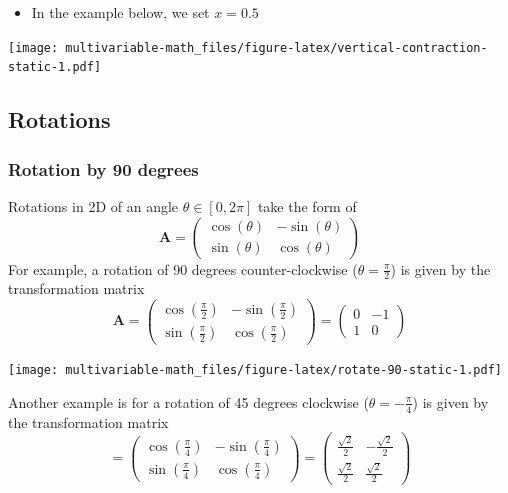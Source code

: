 \documentclass[
]{book}
\providecommand{\tightlist}{%
  \setlength{\itemsep}{0pt}\setlength{\parskip}{0pt}}
\theoremstyle{definition}
\theoremstyle{definition}
\theoremstyle{definition}
\theoremstyle{definition}
\theoremstyle{remark}
\begin{document}
\begin{itemize}
\tightlist
\item
  In the example below, we set \(x = 0.5\)
\end{itemize}

\texttt{[image: multivariable-math\_files/figure-latex/vertical-contraction-static-1.pdf]}

\hypertarget{rotations}{%
\subsection{Rotations}\label{rotations}}

\hypertarget{rotation-by-90-degrees}{%
\subsubsection{Rotation by 90 degrees}\label{rotation-by-90-degrees}}

Rotations in 2D of an angle \(\theta \in [0, 2\pi]\) take the form of
\[
\mathbf{A} = \begin{pmatrix}
\cos(\theta) & -\sin(\theta) \\
\sin(\theta) & \cos(\theta)
\end{pmatrix}
\]
For example, a rotation of 90 degrees counter-clockwise (\(\theta = \frac{\pi}{2}\)) is given by the transformation matrix
\[
\mathbf{A} = \begin{pmatrix}
\cos(\frac{\pi}{2}) & -\sin(\frac{\pi}{2}) \\
\sin(\frac{\pi}{2}) & \cos(\frac{\pi}{2})
\end{pmatrix} = 
\begin{pmatrix}
0 & -1 \\
1 & 0
\end{pmatrix}
\]

\texttt{[image: multivariable-math\_files/figure-latex/rotate-90-static-1.pdf]}

Another example is for a rotation of 45 degrees clockwise (\(\theta = -\frac{\pi}{4}\)) is given by the transformation matrix
\[
 = \begin{pmatrix}
\cos(\frac{\pi}{4}) & -\sin(\frac{\pi}{4}) \\
\sin(\frac{\pi}{4}) & \cos(\frac{\pi}{4})
\end{pmatrix} = 
\begin{pmatrix}
\frac{\sqrt{2}}{2} & -\frac{\sqrt{2}}{2} \\
\frac{\sqrt{2}}{2} & \frac{\sqrt{2}}{2}
\end{pmatrix}
\]
\end{document}
